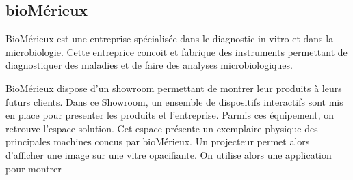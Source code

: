 \subsection{bioMérieux}

BioMérieux est une entreprise spécialisée dans le diagnostic in vitro et dans la microbiologie.
Cette entreprice concoit et fabrique des instruments permettant de diagnostiquer des maladies et de faire des analyses microbiologiques.

BioMérieux dispose d'un showroom permettant de montrer leur produits à leurs futurs clients.
Dans ce Showroom, un ensemble de dispositifs interactifs sont mis en place pour presenter les produits et l'entreprise.
Parmis ces équipement, on retrouve l'espace solution.
Cet espace présente un exemplaire physique des principales machines concus par bioMérieux.
Un projecteur permet alors d'afficher une image sur une vitre opacifiante.
On utilise alors une application pour montrer 